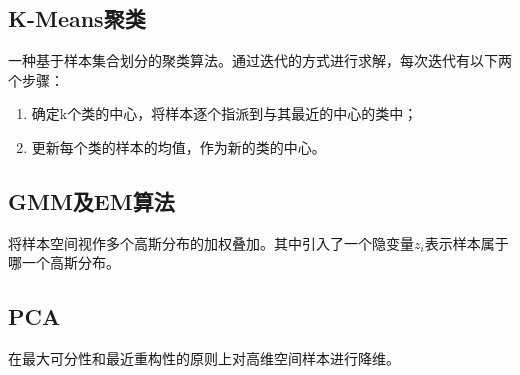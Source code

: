 \documentclass[12pt]{article}
\begin{document}
\subsection{K-Means聚类}
一种基于样本集合划分的聚类算法。通过迭代的方式进行求解，每次迭代有以下两个步骤：
\begin{enumerate}
    \item 确定k个类的中心，将样本逐个指派到与其最近的中心的类中；
    \item 更新每个类的样本的均值，作为新的类的中心。
\end{enumerate}
\subsection{GMM及EM算法}
将样本空间视作多个高斯分布的加权叠加。其中引入了一个隐变量$z_i$表示样本属于哪一个高斯分布。\par
\subsection{PCA}
在最大可分性和最近重构性的原则上对高维空间样本进行降维。\par
\end{document}
